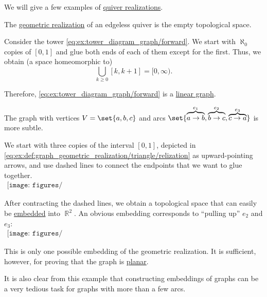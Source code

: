 \begin{example}\label{ex:def:graph_geometric_realization}
  We will give a few examples of \hyperref[def:graph_geometric_realization]{quiver realizations}.

  \begin{thmenum}
     The \hyperref[def:graph_geometric_realization]{geometric realization} of an edgeless quiver is the empty topological space.

     Consider the tower \eqref{eq:ex:tower_diagram_graph/forward}. We start with \( \aleph_0 \) copies of \( [0, 1] \) and glue both ends of each of them except for the first. Thus, we obtain (a space homeomorphic to)
    \begin{equation*}
      \bigcup_{k \geq 0} [k, k + 1] = [0, \infty).
    \end{equation*}

    Therefore, \eqref{eq:ex:tower_diagram_graph/forward} is a \hyperref[def:graph_geometric_realization/linear]{linear graph}.

     The graph with vertices \( V = \set{ a, b, c } \) and arcs \( \set{ \overbrace{a \to b}^{e_1}, \overbrace{b \to c}^{e_2}, \overbrace{c \to a}^{e_3} } \) is more subtle.

    We start with three copies of the interval \( [0, 1] \), depicted in \eqref{eq:ex:def:graph_geometric_realization/triangle/relization} as upward-pointing arrows, and use dashed lines to connect the endpoints that we want to glue together.
    \begin{equation}\label{eq:ex:def:graph_geometric_realization/triangle/relization}
      \begin{aligned}
        \texttt{[image: figures/eq\_\_ex\_\_def\_\_graph\_geometric\_realization\_\_triangle\_\_realization.pdf]}
      \end{aligned}
    \end{equation}

    After contracting the dashed lines, we obtain a topological space that can easily be \hyperref[def:graph_geometric_realization/embedding]{embedded} into \( \BbbR^2 \). An obvious embedding corresponds to \enquote{pulling up} \( e_2 \) and \( e_3 \):
    \begin{equation}\label{eq:ex:def:graph_geometric_realization/triangle/embedding}
      \begin{aligned}
        \texttt{[image: figures/eq\_\_ex\_\_def\_\_graph\_geometric\_realization\_\_triangle\_\_embedding.pdf]}
      \end{aligned}
    \end{equation}

    This is only one possible embedding of the geometric realization. It is sufficient, however, for proving that the graph is \hyperref[def:graph_geometric_realization/planar]{planar}.

    It is also clear from this example that constructing embeddings of graphs can be a very tedious task for graphs with more than a few arcs.
  \end{thmenum}
\end{example}

